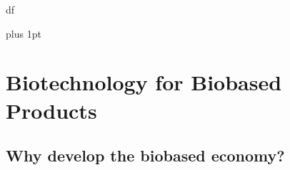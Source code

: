 df\documentclass[]{beamer}
\begin{document}
\begin{CJK}{UTF8}{gbsn}

\parskip=1cm plus 1pt


\section{Biotechnology for Biobased Products}

\subsection{ Why develop the biobased economy?}

\setcounter{questions}{0}
\setcounter{answers}{0}
\setcounter{questions}{0}
\setcounter{answers}{0}



\end{CJK}
\end{document}

